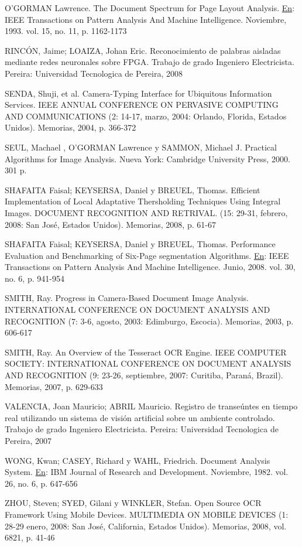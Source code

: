 \documentclass[a4paper, 11pt, oneside]{article}
\begin{document}
O'GORMAN Lawrence. The Document Spectrum for Page Layout Analysis. \underline{En}: IEEE Transactions on Pattern Analysis And Machine Intelligence. Noviembre, 1993. vol. 15, no. 11, p. 1162-1173

RINCÓN, Jaime; LOAIZA, Johan Eric. Reconocimiento de palabras aisladas mediante redes neuronales sobre FPGA. Trabajo de grado Ingeniero Electricista. Pereira: Universidad Tecnologica de Pereira, 2008

SENDA, Shuji, et al. Camera-Typing Interface for Ubiquitous Information Services. IEEE ANNUAL CONFERENCE ON PERVASIVE COMPUTING AND COMMUNICATIONS (2: 14-17, marzo, 2004: Orlando, Florida, Estados Unidos). Memorias, 2004, p. 366-372

SEUL, Machael , O'GORMAN Lawrence y SAMMON, Michael J. Practical Algorithms for Image Analysis. Nueva York: Cambridge University Press, 2000. 301 p.

SHAFAITA Faisal; KEYSERSA, Daniel y BREUEL, Thomas. Efficient Implementation of Local Adaptative Thersholding Techniques Using Integral Images. DOCUMENT RECOGNITION AND RETRIVAL. (15: 29-31, febrero, 2008: San José, Estados Unidos). Memorias, 2008, p. 61-67

SHAFAITA Faisal; KEYSERSA, Daniel y BREUEL, Thomas. Performance Evaluation and Benchmarking of Six-Page segmentation Algorithms. \underline{En}: IEEE Transactions on Pattern Analysis And Machine Intelligence. Junio, 2008. vol. 30, no. 6, p. 941-954

SMITH, Ray. Progress in Camera-Based Document Image Analysis. INTERNATIONAL CONFERENCE ON DOCUMENT ANALYSIS AND RECOGNITION (7: 3-6, agosto, 2003: Edimburgo, Escocia). Memorias, 2003, p. 606-617

SMITH, Ray. An Overview of the Tesseract OCR Engine. IEEE COMPUTER SOCIETY: INTERNATIONAL CONFERENCE ON DOCUMENT ANALYSIS AND RECOGNITION (9: 23-26, septiembre, 2007: Curitiba, Paraná, Brazil). Memorias, 2007, p. 629-633

VALENCIA, Joan Mauricio; ABRIL Mauricio. Registro de transeúntes en tiempo real utilizando un sistema de visión artificial sobre un ambiente controlado. Trabajo de grado Ingeniero Electricista. Pereira: Universidad Tecnologica de Pereira, 2007

WONG, Kwan; CASEY, Richard y WAHL, Friedrich. Document Analysis System. \underline{En}: IBM Journal of Research and Development. Noviembre, 1982. vol. 26, no. 6, p. 647-656

ZHOU, Steven; SYED, Gilani y WINKLER, Stefan. Open Source OCR Framework Using Mobile Devices. MULTIMEDIA ON MOBILE DEVICES (1: 28-29 enero, 2008: San José, California, Estados Unidos). Memorias, 2008, vol. 6821, p. 41-46
	\clearpage
\end{document}
